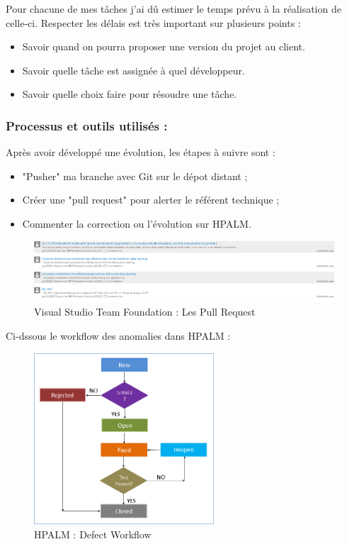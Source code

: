 Pour chacune de mes tâches j'ai dû estimer le temps prévu à la réalisation de celle-ci. Respecter les délais est très important sur plusieurs points :
\begin{itemize}
    \item Savoir quand on pourra proposer une version du projet au client.
    \item Savoir quelle tâche est assignée à quel développeur. 
    \item Savoir quelle choix faire pour résoudre une tâche.
\end{itemize}

\subsubsection{Processus et outils utilisés :}

Après avoir développé une évolution, les étapes à suivre sont :
\begin{itemize}
    \item "Pusher" ma branche avec Git sur le dépot distant ;
    \item Créer une "pull request" pour alerter le référent technique ;
    \item Commenter la correction ou l'évolution sur HPALM.
\end{itemize}

\begin{figure}[!h]
\centering
\includegraphics[width=1\textwidth]{images/PullRequest.png}
\caption{Visual Studio Team Foundation : Les Pull Request}
\end{figure}

Ci-dssous le workflow des anomalies dans HPALM :
\begin{figure}[!h]
\centering
\includegraphics[width=0.6\textwidth]{images/DefectHPALM.png}
\caption{HPALM : Defect Workflow}
\end{figure}

